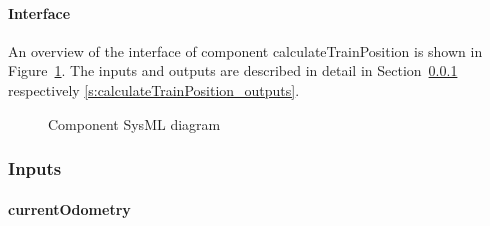 \paragraph{Interface}

An overview of the interface of component calculateTrainPosition is shown in Figure~\ref{f:calculateTrainPosition_interface}. The inputs and outputs are described in detail in Section~\ref{s:calculateTrainPosition_inputs} respectively \ref{s:calculateTrainPosition_outputs}.

\begin{figure}
\center
{}
\caption{Component SysML diagram}\label{f:calculateTrainPosition_interface}
\end{figure}

\subsubsection{Inputs}\label{s:calculateTrainPosition_inputs}

\paragraph{currentOdometry}

